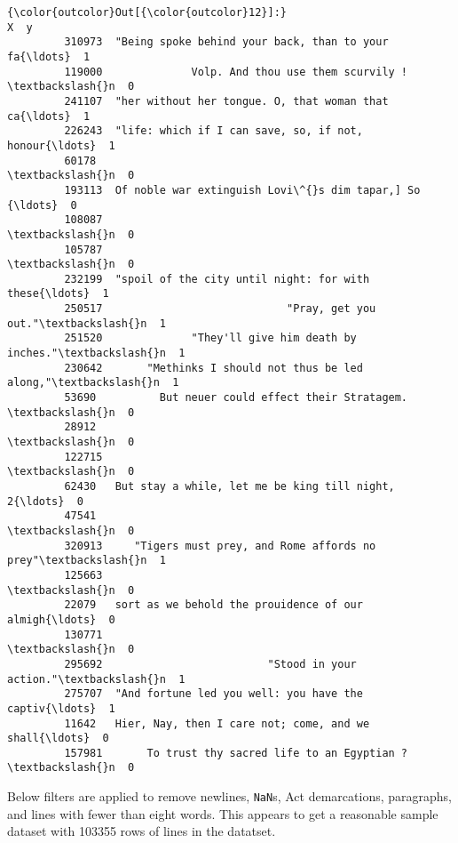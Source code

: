 \documentclass[11pt]{article}
\begin{document}
\begin{Verbatim}[commandchars=\\\{\}]
{\color{outcolor}Out[{\color{outcolor}12}]:}                                                         X  y
         310973  "Being spoke behind your back, than to your fa{\ldots}  1
         119000              Volp. And thou use them scurvily ! \textbackslash{}n  0
         241107  "her without her tongue. O, that woman that ca{\ldots}  1
         226243  "life: which if I can save, so, if not, honour{\ldots}  1
         60178                                                  \textbackslash{}n  0
         193113  Of noble war extinguish Lovi\^{}s dim tapar,] So {\ldots}  0
         108087                                                 \textbackslash{}n  0
         105787                                                 \textbackslash{}n  0
         232199  "spoil of the city until night: for with these{\ldots}  1
         250517                             "Pray, get you out."\textbackslash{}n  1
         251520              "They'll give him death by inches."\textbackslash{}n  1
         230642       "Methinks I should not thus be led along,"\textbackslash{}n  1
         53690          But neuer could effect their Stratagem. \textbackslash{}n  0
         28912                                                  \textbackslash{}n  0
         122715                                                 \textbackslash{}n  0
         62430   But stay a while, let me be king till night, 2{\ldots}  0
         47541                                                  \textbackslash{}n  0
         320913     "Tigers must prey, and Rome affords no prey"\textbackslash{}n  1
         125663                                                 \textbackslash{}n  0
         22079   sort as we behold the prouidence of our almigh{\ldots}  0
         130771                                                 \textbackslash{}n  0
         295692                          "Stood in your action."\textbackslash{}n  1
         275707  "And fortune led you well: you have the captiv{\ldots}  1
         11642   Hier, Nay, then I care not; come, and we shall{\ldots}  0
         157981       To trust thy sacred life to an Egyptian ? \textbackslash{}n  0
\end{Verbatim}
            
    Below filters are applied to remove newlines, \texttt{NaN}s, Act
demarcations, paragraphs, and lines with fewer than eight words. This
appears to get a reasonable sample dataset with 103355 rows of lines in
the datatset.
\end{document}
